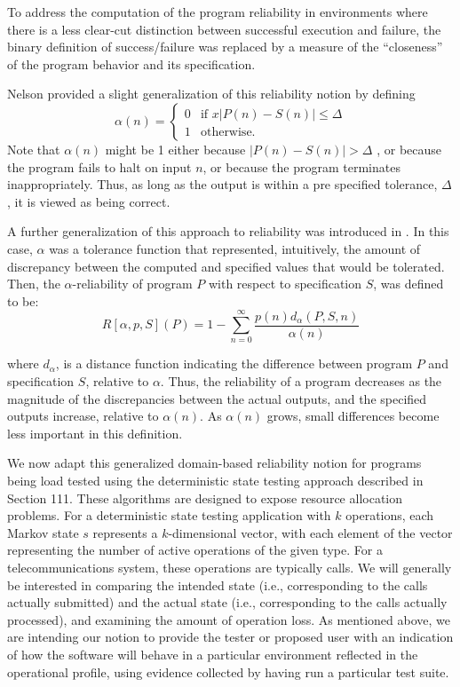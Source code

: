 \documentclass[journal, twoside]{IEEEtran}
\begin{document}
To address the computation of the program reliability in
environments where there is a less clear-cut distinction between successful execution and failure, the binary definition of
success/failure was replaced by a measure of the “closeness”
of the program behavior and its specification. 

Nelson provided a slight generalization of this reliability
notion by defining
\begin{equation*}
    \alpha(n)=
    \begin{cases}
    0   & \text{if } x|P(n) - S(n) |\leq \Delta\\
    1    & \text{otherwise}.
\end{cases}
\end{equation*}
Note that $\alpha(n)$ might be 1 either because $|P(n) - S(n) | > \Delta$  ,
or because the program fails to halt on input $n$, or because the
program terminates inappropriately. Thus, as long as the output is within a pre specified tolerance, $\Delta$, it is viewed as being
correct. 

A further generalization of this approach to reliability was
introduced in \cite{b9}. In this case, $\alpha$ was a tolerance function that
represented, intuitively, the amount of discrepancy between the
computed and specified values that would be tolerated. Then,
the $\alpha$-reliability of program $P$ with respect to specification $S$,
was defined to be: 
\begin{equation*}
    R[\alpha,p,S](P)=1-\sum_{n=0}^{\infty} \frac{p(n) d_\alpha (P,S,n)}{\alpha(n)}
\end{equation*}

where $d_\alpha$,  is a distance function indicating the difference between program $P$ and specification $S$, relative to $\alpha$. Thus, the
reliability of a program decreases as the magnitude of the discrepancies between the actual outputs, and the specified outputs increase, relative to $\alpha(n)$. As $\alpha(n)$ grows, small differences become less important in this definition.

We now adapt this generalized domain-based reliability notion for programs being load tested using the deterministic
state testing approach described in Section 111. These algorithms are designed to expose resource allocation problems.
For a deterministic state testing application with $k$ operations,
each Markov state $s$ represents a $k$-dimensional vector, with
each element of the vector representing the number of active
operations of the given type. For a telecommunications system,
these operations are typically calls. We will generally be interested in comparing the intended state (i.e., corresponding to
the calls actually submitted) and the actual state (i.e., corresponding to the calls actually processed), and examining the
amount of operation loss. As mentioned above, we are intending our notion to provide the tester or proposed user with an
indication of how the software will behave in a particular environment reflected in the operational profile, using evidence
collected by having run a particular test suite. 
\end{document}
